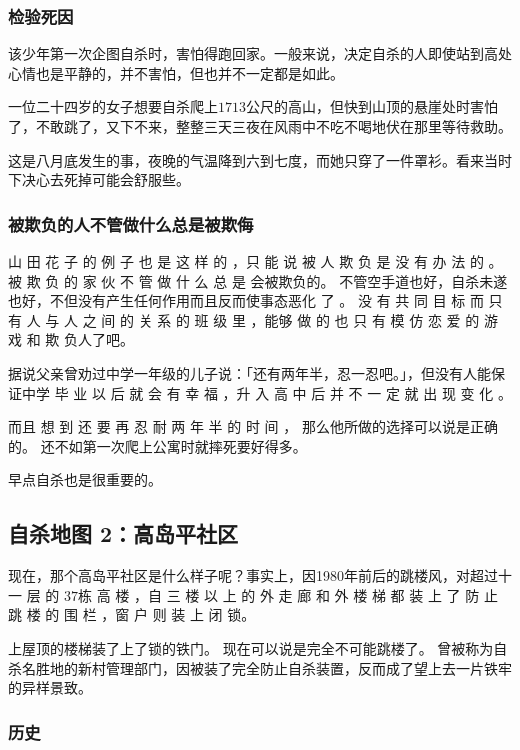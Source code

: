 \documentclass[UTF8]{ctexart}
\begin{document}
\subsubsection*{检验死因}

该少年第一次企图自杀时，害怕得跑回家。一般来说，决定自杀的人即使站到高处心情也是平静的，并不害怕，但也并不一定都是如此。

一位二十四岁的女子想要自杀爬上$1713$公尺的高山，但快到山顶的悬崖处时害怕了，不敢跳了，又下不来，整整三天三夜在风雨中不吃不喝地伏在那里等待救助。

这是八月底发生的事，夜晚的气温降到六到七度，而她只穿了一件罩衫。看来当时下决心去死掉可能会舒服些。

\subsubsection*{被欺负的人不管做什么总是被欺侮}

 山 田 花 子 的 例 子 也 是 这 样 的 ，只 能 说 被 人 欺 负 是 没 有 办 法 的 。
被 欺 负 的 家 伙 不 管 做 什 么 总 是 会被欺负的。
不管空手道也好，自杀未遂也好，不但没有产生任何作用而且反而使事态恶化 了 。
没 有 共 同 目 标 而 只 有 人 与 人 之 间 的 关 系 的 班 级 里 ，能够 做 的 也 只 有 模 仿 恋 爱 的 游 戏 和 欺 负人了吧。

据说父亲曾劝过中学一年级的儿子说：「还有两年半，忍一忍吧。」，但没有人能保证中学 毕 业 以 后 就 会 有 幸 福 ，升 入 高 中 后 并 不 一 定 就 出 现 变 化 。

而且 想 到 还 要 再 忍 耐 两 年 半 的 时 间 ， 那么他所做的选择可以说是正确的。
还不如第一次爬上公寓时就摔死要好得多。 

早点自杀也是很重要的。

\subsection{自杀地图 2：高岛平社区}

现在，那个高岛平社区是什么样子呢？事实上，因1980年前后的跳楼风，对超过十一 层 的 $37$栋 高 楼 ，自 三 楼 以 上 的 外 走 廊 和 外 楼 梯 都 装 上 了 防 止 跳 楼 的 围 栏 ，窗 户 则 装 上 闭 锁。

上屋顶的楼梯装了上了锁的铁门。
现在可以说是完全不可能跳楼了。
曾被称为自杀名胜地的新村管理部门，因被装了完全防止自杀装置，反而成了望上去一片铁牢的异样景致。

\subsubsection{历史}
\end{document}
